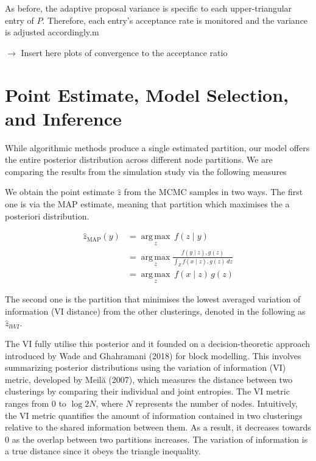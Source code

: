 \documentclass[11pt]{amsart}
\begin{document}
As before, the adaptive proposal variance is specific to each upper-triangular entry of $P$. Therefore, each entry's acceptance rate is monitored and the variance is adjusted accordingly.m

$\rightarrow$ Insert here plots of convergence to the acceptance ratio




\clearpage

\section{Point Estimate, Model Selection,  and Inference}

While algorithmic methods produce a single estimated partition, our model offers the entire posterior distribution across different node partitions. We are comparing the results from the simulation study via the following measures

We obtain the point estimate $\hat{z}$ from the MCMC samples in two ways. The first one is via the MAP estimate, meaning that partition which maximises the a posteriori distribution. 

\begin{align}
\hat{z}_{\mathrm{MAP}}(y) &= \underset{z}{\operatorname{arg\,max}} \ f(z \mid y) \nonumber \\
& = \underset{z}{\operatorname{arg\,max}} \frac{f(y \mid z) , g(z)}{\int_{Z} f(x \mid z) , g(z) \, d z} \nonumber \\
& = \underset{z}{\operatorname{arg\,max}} \ f(x \mid z) \, g(z)
\end{align}

The second one is the partition that minimises the lowest averaged variation of information (VI distance) from the other clusterings, denoted in the following as $\hat{z}_{lb VI}$.

The VI fully utilise this posterior and it founded on a decision-theoretic approach introduced by Wade and Ghahramani (2018) for block modelling. This involves summarizing posterior distributions using the variation of information (VI) metric, developed by Meilă (2007), which measures the distance between two clusterings by comparing their individual and joint entropies. The VI metric ranges from 0 to $\log 2 N$, where $N$ represents the number of nodes. Intuitively, the VI metric quantifies the amount of information contained in two clusterings relative to the shared information between them. As a result, it decreases towards 0 as the overlap between two partitions increases. 
The variation of information is a true distance since  it obeys the triangle inequality.
\end{document}
